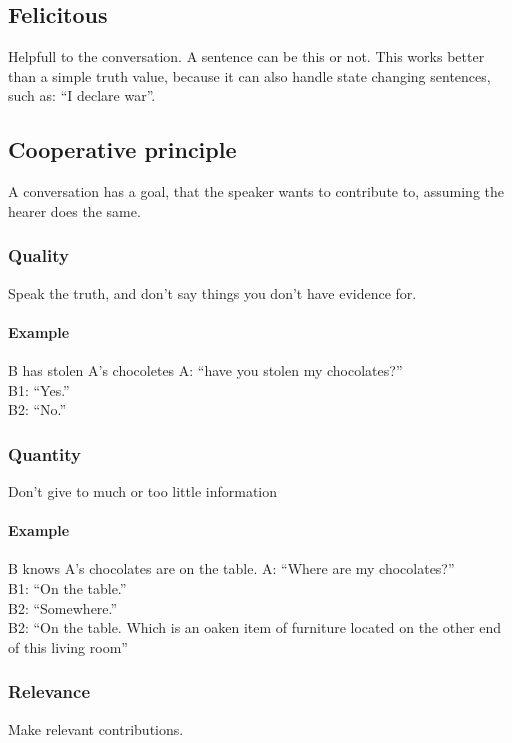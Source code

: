 \documentclass{article}
\begin{document}
\subsection{Felicitous}
Helpfull to the conversation. A sentence can be this or not. This
works better than a simple truth value, because it can also handle
state changing sentences, such as: ``I declare war''.

\subsection{Cooperative principle}
A conversation has a goal, that the speaker wants to contribute to, assuming
the hearer does the same.

\subsubsection{Quality}
Speak the truth, and don't say things you don't have evidence for.

\paragraph{Example} B has stolen A's chocoletes
A: ``have you stolen my chocolates?''\\
B1: {\color{green} ``Yes.''}\\
B2: {\color{red} ``No.''}

\subsubsection{Quantity}
Don't give to much or too little information

\paragraph{Example} B knows A's chocolates are on the table.
A: ``Where are my chocolates?''\\
B1: {\color{green} ``On the table.''}\\
B2: {\color{red} ``Somewhere.''}\\
B2: {\color{red} ``On the table. Which is an oaken item of furniture
located on the other end of this living room''}

\subsubsection{Relevance}
Make relevant contributions.
\end{document}
